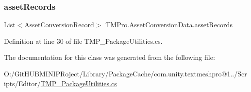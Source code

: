 \subsubsection{\texorpdfstring{assetRecords}{assetRecords}}
{\footnotesize\ttfamily List$<$\mbox{\hyperlink{struct_t_m_pro_1_1_asset_conversion_record}{Asset\+Conversion\+Record}}$>$ T\+M\+Pro.\+Asset\+Conversion\+Data.\+asset\+Records}



Definition at line 30 of file T\+M\+P\+\_\+\+Package\+Utilities.\+cs.



The documentation for this class was generated from the following file\+:\begin{DoxyCompactItemize}
\item 
O\+:/\+Git\+H\+U\+B\+M\+I\+N\+I\+P\+Roject/\+Library/\+Package\+Cache/com.\+unity.\+textmeshpro@1../\+Scripts/\+Editor/\mbox{\hyperlink{_t_m_p___package_utilities_8cs}{T\+M\+P\+\_\+\+Package\+Utilities.\+cs}}\end{DoxyCompactItemize}
